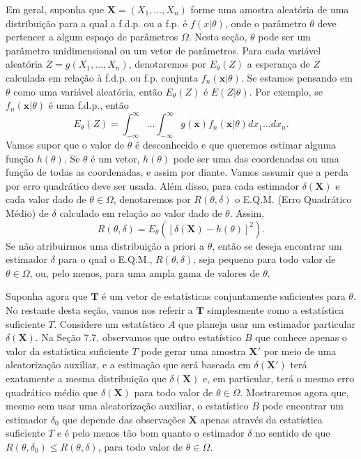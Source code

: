 Em geral, suponha que $\mathbf{X}=(X_1, \dots, X_n)$ forme uma amostra aleatória de uma distribuição para a qual a f.d.p. ou a f.p. é $f(x|\theta)$, onde o parâmetro $\theta$ deve pertencer a algum espaço de parâmetros $\Omega$. Nesta seção, $\theta$ pode ser um parâmetro unidimensional ou um vetor de parâmetros. Para cada variável aleatória $Z=g(X_1, \dots, X_n)$, denotaremos por $E_\theta(Z)$ a esperança de $Z$ calculada em relação à f.d.p. ou f.p. conjunta $f_n(\mathbf{x}|\theta)$. Se estamos pensando em $\theta$ como uma variável aleatória, então $E_\theta(Z)$ é $E(Z|\theta)$. Por exemplo, se $f_n(\mathbf{x}|\theta)$ é uma f.d.p., então
\[ E_\theta(Z) = \int_{-\infty}^{\infty} \dots \int_{-\infty}^{\infty} g(\mathbf{x})f_n(\mathbf{x}|\theta)dx_1 \dots dx_n. \]
Vamos supor que o valor de $\theta$ é desconhecido e que queremos estimar alguma função $h(\theta)$. Se $\theta$ é um vetor, $h(\theta)$ pode ser uma das coordenadas ou uma função de todas as coordenadas, e assim por diante. Vamos assumir que a perda por erro quadrático deve ser usada. Além disso, para cada estimador $\delta(\mathbf{X})$ e cada valor dado de $\theta \in \Omega$, denotaremos por $R(\theta, \delta)$ o E.Q.M. (Erro Quadrático Médio) de $\delta$ calculado em relação ao valor dado de $\theta$. Assim,
\begin{equation}
R(\theta, \delta) = E_\theta([\delta(\mathbf{X}) - h(\theta)]^2). \tag{7.9.1}
\end{equation}
Se não atribuirmos uma distribuição a priori a $\theta$, então se deseja encontrar um estimador $\delta$ para o qual o E.Q.M., $R(\theta, \delta)$, seja pequeno para todo valor de $\theta \in \Omega$, ou, pelo menos, para uma ampla gama de valores de $\theta$.

Suponha agora que $\mathbf{T}$ é um vetor de estatísticas conjuntamente suficientes para $\theta$. No restante desta seção, vamos nos referir a $\mathbf{T}$ simplesmente como a estatística suficiente $T$. Considere um estatístico $A$ que planeja usar um estimador particular $\delta(\mathbf{X})$. Na Seção 7.7, observamos que outro estatístico $B$ que conhece apenas o valor da estatística suficiente $T$ pode gerar uma amostra $\mathbf{X}'$ por meio de uma aleatorização auxiliar, e a estimação que será baseada em $\delta(\mathbf{X}')$ terá exatamente a mesma distribuição que $\delta(\mathbf{X})$ e, em particular, terá o mesmo erro quadrático médio que $\delta(\mathbf{X})$ para todo valor de $\theta \in \Omega$. Mostraremos agora que, mesmo sem usar uma aleatorização auxiliar, o estatístico $B$ pode encontrar um estimador $\delta_0$ que depende das observações $\mathbf{X}$ apenas através da estatística suficiente $T$ e é pelo menos tão bom quanto o estimador $\delta$ no sentido de que $R(\theta, \delta_0) \le R(\theta, \delta)$, para todo valor de $\theta \in \Omega$.

